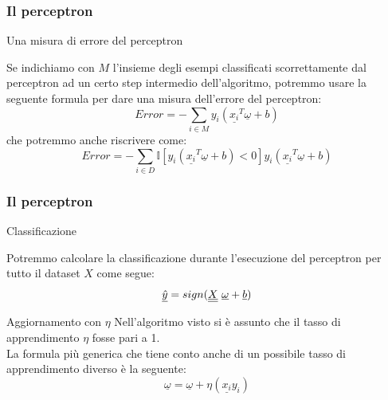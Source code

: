 \begin{frame}
	
	\frametitle{Il perceptron}
	
	\begin{block}{Una misura di errore del perceptron}
	
		Se indichiamo con $M$ l'insieme degli esempi classificati scorrettamente dal perceptron ad un certo step intermedio dell'algoritmo, potremmo usare la seguente formula per dare una misura dell'errore del perceptron:
		$$Error = -\sum_{i \in M} y_i(\underline{x_i}^T\underline{\omega}+b)$$
		che potremmo anche riscrivere come:
		$$Error = -\sum_{i \in D} \mathbb{I}[y_i(\underline{x_i}^T\underline{\omega}+b)<0]y_i(\underline{x_i}^T\underline{\omega}+b)$$
	\end{block}

\end{frame}


\begin{frame}
	
	\frametitle{Il perceptron}
	
	\begin{block}{Classificazione}
		
		Potremmo calcolare la classificazione durante l'esecuzione del perceptron per tutto il dataset $X$ come segue:
		$$\underline{\hat{y}} = sign(\underline{\underline{X}}\text{ }\underline{\omega} + \underline{b})$$
	\end{block}
	
	\begin{block}{Aggiornamento con $\eta$}
		Nell'algoritmo visto si è assunto che il tasso di apprendimento $\eta$ fosse pari a 1.\\
		La formula più generica che tiene conto anche di un possibile tasso di apprendimento diverso è la seguente:
		$$\underline{\omega}=\underline{\omega} + \eta (\underline{x_i} y_i)$$
	\end{block}

\end{frame}


